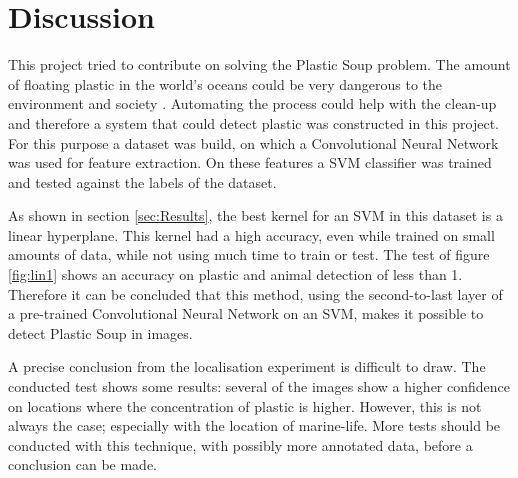 \section{Discussion}
\label{sec:Discussion}
This project tried to contribute on solving the Plastic Soup problem.
The amount of floating plastic in the world's oceans could be very dangerous to the environment and society \citep{moore2011plastic}.
Automating the process could help with the clean-up and therefore a system that could detect plastic was constructed in this project.
For this purpose a dataset was build, on which a Convolutional Neural Network was used for feature extraction.
On these features a SVM classifier was trained and tested against the labels of the dataset.

As shown in section \ref{sec:Results}, the best kernel for an SVM in this dataset is a linear hyperplane. This kernel had a high accuracy, even while trained on small amounts of data, while not using much time to train or test.
The test of figure \ref{fig:lin1} shows an accuracy on plastic and animal detection of less than 1\permil.
Therefore it can be concluded that this method, using the second-to-last layer of a pre-trained Convolutional Neural Network on an SVM, makes it possible to detect Plastic Soup in images.

A precise conclusion from the localisation experiment is difficult to draw.
The conducted test shows some results: several of the images show a higher confidence on locations where the concentration of plastic is higher.
However, this is not always the case; especially with the location of marine-life.
More tests should be conducted with this technique, with possibly more annotated data, before a conclusion can be made.


